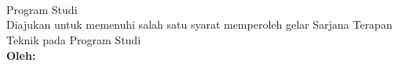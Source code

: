 \begin{titlepage}
    \begin{center}

        \begin{doublespace}
            \textbf{\MakeUppercase{\large{\tipe}}}\\[0.5cm]\textbf{\MakeUppercase{\normalsize{\judulid}}}\\[3cm]
            
        \end{doublespace}
        {\tipe}\\
        Program Studi {\prodi} \\[2cm]
        Diajukan untuk memenuhi salah satu syarat memperoleh gelar Sarjana Terapan Teknik pada Program Studi {\prodi} {\departemen} {\fakultas} {\universitas}\\[3cm]
        

        \textbf{\normalsize {Oleh:}} \\
        \textbf{\normalsize \MakeUppercase{\underline{\penulis}}} \\
        \textbf{\normalsize \MakeUppercase{{\nim}}} \\[3cm]


        \textbf{\normalsize \MakeUppercase{\prodi}}\\
        \textbf{\normalsize \MakeUppercase{\departemen}}\\
        \textbf{\normalsize \MakeUppercase{\fakultas}}\\
        \textbf{\normalsize \MakeUppercase{\universitas}}\\
        \textbf{\normalsize \the\year{}}\\
    \end{center}
\end{titlepage}